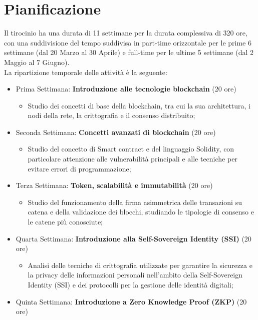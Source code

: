\section{Pianificazione}
Il tirocinio ha una durata di 11 settimane per la durata complessiva di 320 ore, con una suddivisione del tempo suddivisa 
in part-time orizzontale per le prime 6 settimane (dal 20 Marzo al 30 Aprile) e full-time per le ultime 5 settimane (dal 2 Maggio al 7 Giugno).\\
La ripartizione temporale delle attività è la seguente:
\begin{itemize}
    \item{Prima Settimana: \textbf{Introduzione alle tecnologie blockchain} (20 ore)}
    \begin{itemize}
        \item Studio dei concetti di base della blockchain, tra cui la sua architettura, i nodi della rete, la crittografia e il consenso distribuito;
    \end{itemize}
    \item{Seconda Settimana: \textbf{Concetti avanzati di blockchain} (20 ore)}
    \begin{itemize}
        \item Studio del concetto di Smart contract e del linguaggio Solidity, con particolare attenzione alle vulnerabilità principali e alle tecniche per evitare errori di programmazione;
    \end{itemize}
    \item{Terza Settimana: \textbf{Token, scalabilità e immutabilità} (20 ore)}
    \begin{itemize}
        \item Studio del funzionamento della firma asimmetrica delle transazioni su catena e della validazione dei blocchi, studiando le tipologie di consenso e le catene più conosciute;
    \end{itemize}
    \item{Quarta Settimana: \textbf{Introduzione alla Self-Sovereign Identity (SSI)} (20 ore)}
    \begin{itemize}
        \item Analisi delle tecniche di crittografia utilizzate per garantire la sicurezza e la privacy delle informazioni personali nell'ambito della Self-Sovereign Identity (SSI) e dei protocolli per la gestione delle identità digitali;
    \end{itemize}
    \item{Quinta Settimana: \textbf{Introduzione a Zero Knowledge Proof (ZKP)} (20 ore)}

\end{itemize}
